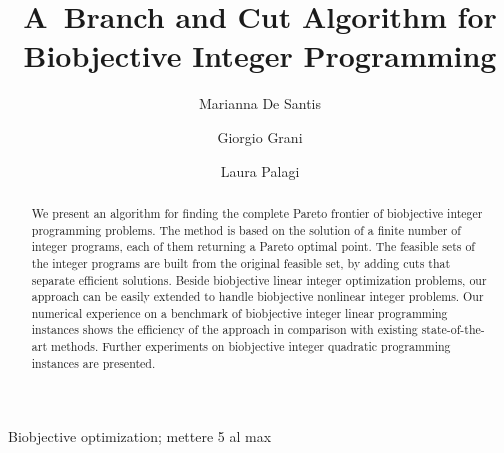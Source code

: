 \documentclass[preprint,12pt]{elsarticle}
\begin{document}
\begin{frontmatter}

\title{\bf A~Branch and Cut Algorithm for Biobjective Integer Programming} \vspace{2mm}
\author{Marianna De Santis}

\address{Corresponding author\\ Department of Computer, Control and Management Engineering  Antonio Ruberti, Sapienza University of Rome. Via Ariosto 25, Rome, 00185, Italy. E-mail: marianna.desantis@uniroma1.it Tel +39 0677274 0XX }


\author{Giorgio Grani}

\address{Department of Computer, Control and Management Engineering  Antonio Ruberti, Sapienza University of Rome. Via Ariosto 25, Rome, 00185,  Italy. E-mail: g.grani@uniroma1.it}

\author{Laura Palagi}

\address{Department of Computer, Control and Management Engineering  Antonio Ruberti, Sapienza University of Rome. Via Ariosto 25, Rome, 00185,  Italy. E-mail: laura.palagi@uniroma1.it}

\begin{abstract}
We present an algorithm for finding the complete Pareto frontier of biobjective integer programming problems.
The method is based on the solution of a finite number of integer programs, each of them returning a Pareto optimal point.
The feasible sets of the integer programs are built from the original feasible set, by adding cuts that separate efficient solutions.
Beside biobjective  linear  integer optimization problems, our approach can be easily extended to handle biobjective nonlinear integer problems.
Our numerical experience on a benchmark of biobjective integer linear programming instances shows the efficiency of the approach
in comparison with existing state-of-the-art methods. Further experiments on biobjective integer quadratic programming instances are presented.\end{abstract}

\begin{keyword} Biobjective optimization; mettere 5 al max
\end{keyword}

\end{frontmatter}
\end{document}

